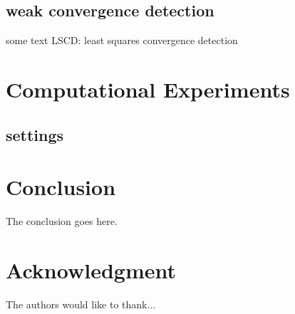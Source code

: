 \documentclass[conference]{IEEEtran}
\begin{document}
\subsection{weak convergence detection}
some text 
LSCD: least squares convergence detection

%
\section{Computational Experiments}

\subsection{settings}

\section{Conclusion}
The conclusion goes here.



\section*{Acknowledgment}


The authors would like to thank...\cite{IEEEhowto:kopka1}






\end{document}
